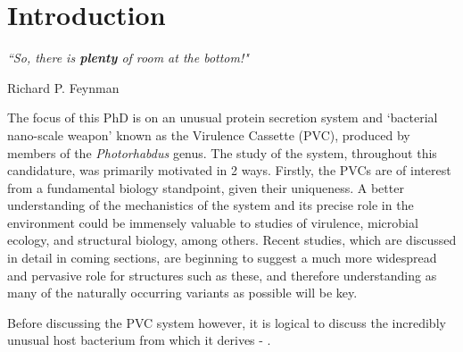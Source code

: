 
\pagestyle{IHA-fancy-style}

\chapter{Introduction}\label{intro}

\epigraph{\textit{``So, there is \textbf{plenty} of room at the bottom!"}}{Richard P. Feynman}

The focus of this PhD is on an unusual protein secretion system and `bacterial nano-scale weapon' known as the \Pa{} Virulence Cassette (PVC), produced by members of the \emph{Photorhabdus} genus. The study of the system, throughout this candidature, was primarily motivated in 2 ways. Firstly, the PVCs are of interest from a fundamental biology standpoint, given their uniqueness. A better understanding of the mechanistics of the system and its precise role in the environment could be immensely valuable to studies of virulence, microbial ecology, and structural biology, among others. Recent studies, which are discussed in detail in coming sections, are beginning to suggest a much more widespread and pervasive role for structures such as these, and therefore understanding as many of the naturally occurring variants as possible will be key. 



Before discussing the PVC system however, it is logical to discuss the incredibly unusual host bacterium from which it derives - \Pa.

\section{\Pa}

